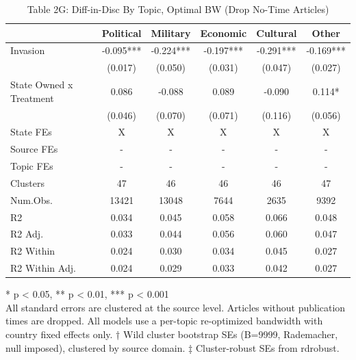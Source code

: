 \begin{table}[t]
\caption{\label{tab:table2g}Table 2G: Diff-in-Disc By Topic, Optimal BW (Drop No-Time Articles)} 
\fontsize{12.0pt}{14.0pt}\selectfont
\begin{tabular*}{\linewidth}{@{\extracolsep{\fill}}lccccc}
\toprule
  & Political & Military & Economic & Cultural & Other \\ 
\midrule\addlinespace[2.5pt]
Invasion & -0.095*** & -0.224*** & -0.197*** & -0.291*** & -0.169*** \\ 
 & (0.017) & (0.050) & (0.031) & (0.047) & (0.027) \\ 
State Owned x Treatment & 0.086 & -0.088 & 0.089 & -0.090 & 0.114* \\ 
{} & {(0.046)} & {(0.070)} & {(0.071)} & {(0.116)} & {(0.056)} \\ 
State FEs & X & X & X & X & X \\ 
Source FEs & - & - & - & - & - \\ 
Topic FEs & - & - & - & - & - \\ 
Clusters & 47 & 46 & 46 & 46 & 47 \\ 
Num.Obs. & 13421 & 13048 & 7644 & 2635 & 9392 \\ 
R2 & 0.034 & 0.045 & 0.058 & 0.066 & 0.048 \\ 
R2 Adj. & 0.033 & 0.044 & 0.056 & 0.060 & 0.047 \\ 
R2 Within & 0.024 & 0.030 & 0.034 & 0.045 & 0.027 \\ 
R2 Within Adj. & 0.024 & 0.029 & 0.033 & 0.042 & 0.027 \\ 
\bottomrule
\end{tabular*}
\begin{minipage}{\linewidth}
\vspace{.05em}
* p < 0.05, ** p < 0.01, *** p < 0.001\\
All standard errors are clustered at the source level. Articles without
publication times are dropped. All models use a per-topic re-optimized
bandwidth with country fixed effects only. † Wild cluster bootstrap SEs (B=9999,
Rademacher, null imposed), clustered by source domain. ‡ Cluster-robust SEs from
rdrobust.\\
\end{minipage}
\end{table}

